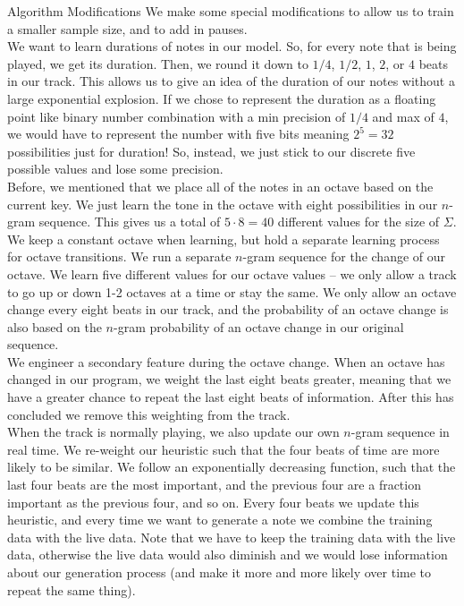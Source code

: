 \documentclass[11pt]{article}
\begin{document}
\begin{section}{Algorithm Modifications}
We make some special modifications to allow us to train a smaller sample size, and to add in pauses. \\

We want to learn durations of notes in our model. So, for every note that is being played, we get its duration. Then, we round it down to $1/4$, $1/2$, $1$, $2$, or $4$ beats in our track. This allows us to give an idea of the duration of our notes without a large exponential explosion. If we chose to represent the duration as a floating point like binary number combination with a min precision of $1/4$ and max of $4$, we would have to represent the number with five bits meaning $2^5 = 32$ possibilities just for duration! So, instead, we just stick to our discrete five possible values and lose some precision.\\

Before, we mentioned that we place all of the notes in an octave based on the current key. We just learn the tone in the octave with eight possibilities in our $n$-gram sequence. This gives us a total of $5 \cdot 8 = 40$ different values for the size of $\Sigma$. We keep a constant octave when learning, but hold a separate learning process for octave transitions. We run a separate $n$-gram sequence for the change of our octave. We learn five different values for our octave values -- we only allow a track to go up or down 1-2 octaves at a time or stay the same. We only allow an octave change every eight beats in our track, and the probability of an octave change is also based on the $n$-gram probability of an octave change in our original sequence. \\

We engineer a secondary feature during the octave change. When an octave has changed in our program, we weight the last eight beats greater, meaning that we have a greater chance to repeat the last eight beats of information. After this has concluded we remove this weighting from the track. \\

When the track is normally playing, we also update our own $n$-gram sequence in real time. We re-weight our heuristic such that the four beats of time are more likely to be similar. We follow an exponentially decreasing function, such that the last four beats are the most important, and the previous four are a fraction important as the previous four, and so on. Every four beats we update this heuristic, and every time we want to generate a note we combine the training data with the live data. Note that we have to keep the training data with the live data, otherwise the live data would also diminish and we would lose information about our generation process (and make it more and more likely over time to repeat the same thing).\\


\end{section}
\end{document}
